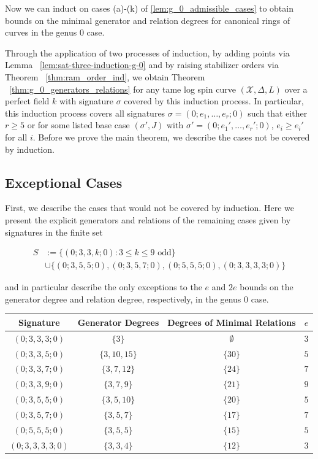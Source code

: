 \documentclass{amsart}
\theoremstyle{plain}
\theoremstyle{definition}
\theoremstyle{remark}
\numberwithin{equation}{section}
\newcommand\ssec{\subsection}
\newcommand \sx{\mathscr X}
\begin{document}
Now we can induct on cases (a)-(k) of \ref{lem:g_0_admissible_cases}
to obtain bounds on the minimal generator and relation degrees for
canonical rings of curves in the genus 0 case.

Through the application of two processes of induction, by adding 
points via Lemma ~\ref{lem:sat-three-induction-g-0} and by raising
stabilizer orders via Theorem ~\ref{thm:ram_order_ind},
we obtain Theorem ~\ref{thm:g_0_generators_relations} for any tame
log spin curve $(\sx, \Delta, L)$ over a perfect field $k$ with
signature $\sigma$ covered by this induction process.
In particular, this induction process covers all signatures $\sigma
= (0; e_1, \ldots, e_r; 0)$ such that either $r \geq 5$ or
for some listed base case $(\sigma', J)$ with $\sigma' = (0; e_1',
\ldots, e_r'; 0)$, $e_i \geq e_i'$ for all $i$.
Before we prove the main theorem, we describe the cases not be
covered by induction.

\ssec{Exceptional Cases}
\label{ssec:g_0_exceptional}
First, we describe the cases that would not be covered by induction.
Here we present the explicit generators and relations of the remaining
cases given by signatures in the finite set

\begin{align*}
	S &:= \{(0; 3, 3, k; 0) : 3 \leq k \leq 9 \text{ odd}\} \\
		&\cup \{(0; 3, 5, 5; 0) ,(0; 3, 5, 7; 0), (0; 5, 5, 5; 0), (0; 3, 3, 3, 3; 0)\}
\end{align*}

\noindent
and in particular describe the only exceptions to the $e$ and $2e$
bounds on the generator degree and relation degree, respectively,
in the genus 0 case.

\begin{longtable}
	{| c || c | c | c |}
	\hline
	Signature & Generator Degrees & Degrees of Minimal Relations & $e$ \\
	\hline
	\hline

	$(0; 3, 3, 3; 0)$ & $\{3\}$ & $\emptyset$ & $3$ \\	\hline

	$(0; 3, 3, 5; 0)$ & $\{3, 10, 15\}$ & $\{30\}$ & $5$ \\	\hline
	
	$(0; 3, 3, 7; 0)$ & $\{3, 7, 12\}$ & $\{24\}$ & $7$ \\	\hline
	
	$(0; 3, 3, 9; 0)$ & $\{3, 7, 9\}$ & $\{21\}$ & $9$ \\	\hline
	
	$(0; 3, 5, 5; 0)$ & $\{3, 5, 10\}$ & $\{20\}$ & $5$ \\	\hline
	
	$(0; 3, 5, 7; 0)$ & $\{3, 5, 7\}$ & $\{17\}$ & $7$ \\	\hline
	
	$(0; 5, 5, 5; 0)$ & $\{3, 5, 5\}$ & $\{15\}$ & $5$ \\	\hline
	
	$(0; 3, 3, 3, 3; 0)$ & $\{3, 3, 4\}$ & $\{12\}$ & $3$ \\	\hline
\end{longtable}
\end{document}
